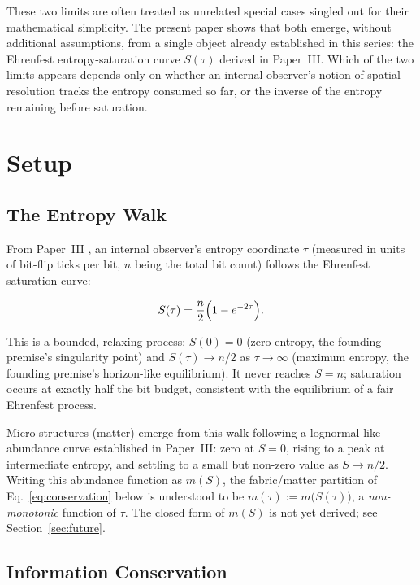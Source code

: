 \documentclass[11pt]{article}
\begin{document}
These two limits are often treated as unrelated special cases singled
out for their mathematical simplicity. The present paper shows that both
emerge, without additional assumptions, from a single object already
established in this series: the Ehrenfest entropy-saturation curve
$S(\tau)$ derived in Paper~III. Which of the two limits appears depends
only on whether an internal observer's notion of spatial resolution
tracks the entropy consumed so far, or the inverse of the entropy
remaining before saturation.


\section{Setup}
\label{sec:setup}

\subsection{The Entropy Walk}

From Paper~III \cite{meskanen2003}, an internal observer's entropy
coordinate $\tau$ (measured in units of bit-flip ticks per bit, $n$
being the total bit count) follows the Ehrenfest saturation curve:

\begin{equation}
  S(\tau) = \frac{n}{2}\Bigl(1 - e^{-2\tau}\Bigr).
  \label{eq:ehrenfest}
\end{equation}

This is a bounded, relaxing process: $S(0)=0$ (zero entropy, the
founding premise's singularity point) and $S(\tau)\to n/2$ as
$\tau\to\infty$ (maximum entropy, the founding premise's horizon-like
equilibrium). It never reaches $S=n$; saturation occurs at exactly half
the bit budget, consistent with the equilibrium of a fair Ehrenfest
process.

Micro-structures (matter) emerge from this walk following a
lognormal-like abundance curve established in Paper~III: zero at
$S=0$, rising to a peak at intermediate entropy, and settling to a
small but non-zero value as $S\to n/2$. Writing this abundance function
as $m(S)$, the fabric/matter partition of Eq.~\eqref{eq:conservation}
below is understood to be $m(\tau) := m\bigl(S(\tau)\bigr)$, a
\emph{non-monotonic} function of $\tau$. The closed form of $m(S)$ is not yet derived; see Section~\ref{sec:future}.

\subsection{Information Conservation}
\end{document}
